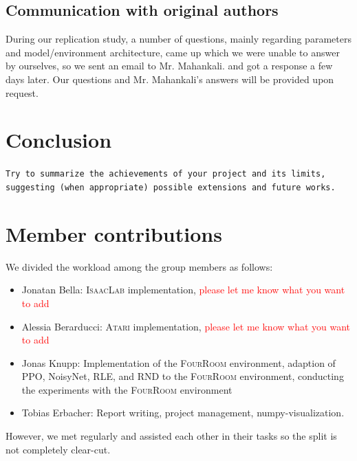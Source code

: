 \documentclass[10pt]{article} %
\begin{document}
\subsection{Communication with original authors}

\noindent During our replication study, a number of questions, mainly regarding parameters and model/environment architecture, came up which we were unable to answer by ourselves, so we sent an email to Mr. Mahankali. and got a response a few days later. Our questions and Mr. Mahankali's answers will be provided upon request. 

\section{Conclusion}
\texttt{Try to summarize the achievements of your project and its limits, suggesting (when appropriate) possible extensions and future works.}

\section*{Member contributions}

\noindent We divided the workload among the group members as follows:

\begin{itemize}
  \item Jonatan Bella: \textsc{IsaacLab} implementation, \textcolor{red}{please let me know what you want to add}
  \item Alessia Berarducci: \textsc{Atari} implementation, \textcolor{red}{please let me know what you want to add}
  \item Jonas Knupp: Implementation of the \textsc{FourRoom} environment, adaption of PPO, NoisyNet, RLE, and RND to the \textsc{FourRoom} environment, conducting the experiments with the \textsc{FourRoom} environment
  \item Tobias Erbacher: Report writing, project management, numpy-visualization.
\end{itemize}

\noindent However, we met regularly and assisted each other in their tasks so the split is not completely clear-cut.






\end{document}
